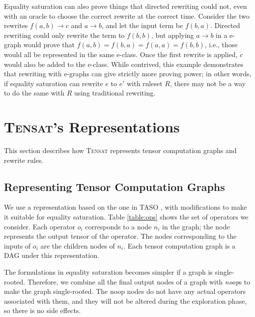 \documentclass{article}
\newcommand{\ourname}[0]{\textsc{Tensat}}
\begin{document}
Equality saturation can also prove things that directed rewriting could not, 
  even with an oracle to choose the correct rewrite at the correct time.
Consider the two rewrites $f(a, b) \to c$ and $a \to b$, and let the input term be $f(b, a)$.
Directed rewriting could only rewrite the term to $f(b, b)$, but applying $a \to b$ in a e-graph would 
prove that $f(a, b) = f(b, a) = f(a, a) = f(b, b)$, i.e., those would all be represented in the same e-class.
Once the first rewrite is applied, $c$ would also be added to the e-class.
While contrived, this example demonstrates that rewriting with e-graphs can give strictly more proving power;
in other words, if equality saturation can rewrite $e$ to $e'$ with ruleset $R$, 
there may not be a way to do the same with $R$ using traditional rewriting.

\section{\ourname{}'s Representations}

This section describes how \ourname{} represents tensor computation graphs and rewrite rules.

\subsection{Representing Tensor Computation Graphs}
\label{sec:language}

We use a representation based on the one in TASO \cite{taso}, with modifications to make it suitable for equality saturation. 
Table \ref{table:ops} shows the set of operators we consider. 
Each operator $o_i$ corresponds to a node $n_i$ in the graph; the node represents the output tensor of the operator.
The nodes corresponding to the inputs of $o_i$ are the children nodes of $n_i$. 
Each tensor computation graph is a DAG under this representation.

The formulations in equality saturation becomes simpler if a graph is single-rooted. Therefore, we combine all the final output nodes of a graph with \emph{noop}s to make the graph single-rooted. The noop nodes do not have any actual operators associated with them, and they will not be altered during the exploration phase, so there is no side effects.
\end{document}
